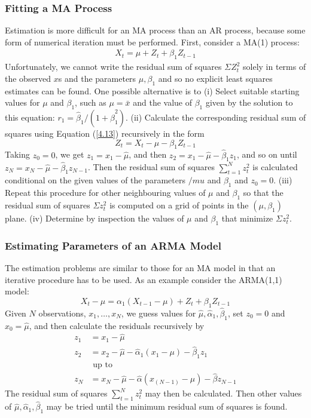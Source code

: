\subsubsection{Fitting a MA Process}
Estimation is more difficult for an MA process than an AR process, because some form of numerical iteration must be performed. First, consider a MA(1) process: \begin{align}
X_t = \mu + Z_t + \beta_1 Z_{t-1} \label{4.13}
\end{align}
Unfortunately, we cannot write the residual sum of squares $\Sigma Z_t^2$ solely in terms of the observed $x$s and the parameters $\mu, \beta_1$ and so no explicit least squares estimates can be found. One possible alternative is to (i) Select suitable starting values for $\mu$ and $\beta_1$, such as $\mu=\bar{x}$ and the value of $\beta_1$ given by the solution to this equation: $r_1 = \hat{\beta}_1/ (1+\hat{\beta}_1^2)$. (ii) Calculate the corresponding residual sum of squares using Equation (\ref{4.13}) recursively in the form \[ Z_t = X_t -\mu -\beta_1 Z_{t-1}\] Taking $z_0 = 0$, we get $z_1 = x_1 -\hat{\mu}$, and then $z_2 = x_1 -\hat{\mu}-\hat{\beta}_1 z_1$, and so on until $z_N = x_N- \hat{\mu}- \hat{\beta}_1 z_{N-1}$. Then the residual sum of squares $\sum_{t=1}^N z_t^2$ is calculated conditional on the given values of the parameters $/mu$ and $\beta_1$ and $z_0=0$. (iii) Repeat this procedure for other neighbouring values of $\mu$ and $\beta_1$ so that the residual sum of squares $\Sigma z_t^2$ is computed on a grid of points in the $(\mu,\beta_1)$ plane. (iv) Determine by inspection the values of $\mu$ and $\beta_1$ that minimize $\Sigma z_t^2$.


\subsubsection{Estimating Parameters of an ARMA Model}
The estimation problems are similar to those for an MA model in that an iterative procedure has to be used. As an example consider the ARMA(1,1) model: \[
X_t - \mu = \alpha_1 (X_{t-1}- \mu) + Z_t + \beta_1 Z_{t-1}
\]Given $N$ observations, $x_1, \ldots, x_N$, we guess values for $\hat{\mu}, \hat{\alpha}_1, \hat{\beta}_1 $, set $z_0 = 0$ and $x_0 = \hat{\mu}$, and then calculate the residuals recursively by \begin{align*}
    z_1 &= x_1 - \hat{\mu} \\
    z_2 &= x_2-\hat{\mu} - \hat{\alpha}_1 (x_1-\mu) - \hat{\beta}_1 z_1 \\
    &\text{ up to} \\
    z_N&= x_N - \hat{\mu}- \hat{\alpha}(x_(N-1) -\mu) - \hat{\beta}z_{N-1}
\end{align*}
The residual sum of squares $\sum_{t=1}^N z_t^2$ may then be calculated. Then other values of $\hat{\mu}, \hat{\alpha}_1, \hat{\beta}_1 $ may be tried until the minimum residual sum of squares is found.



